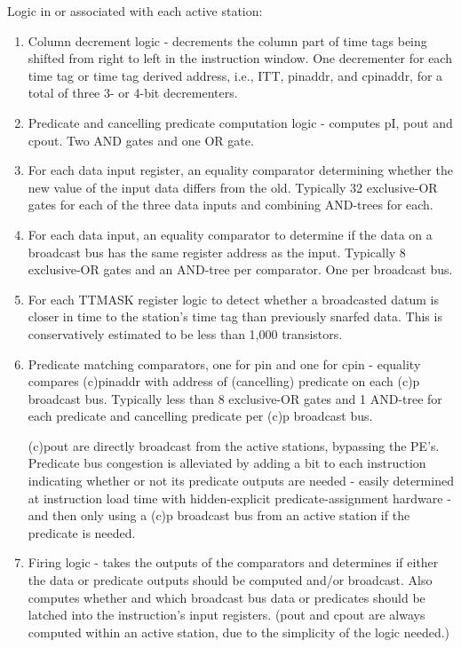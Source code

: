 \documentclass[10pt,dvips]{article}
\begin{document}
Logic in or associated with each active station:
\begin{enumerate}
\item Column decrement logic - decrements the column part of time tags being
shifted from right to left in the instruction window. One decrementer for each time tag
or time tag derived address, i.e., ITT, pinaddr, and cpinaddr, for a total of three
3- or 4-bit decrementers.

\item Predicate and cancelling predicate computation logic - computes pI, pout and
cpout. Two AND gates and one OR gate.

\item For each data input register, an equality comparator determining whether the new
value of the input data differs from the old. Typically 32 exclusive-OR gates for
each of the three data inputs and combining AND-trees for each. 

\item For each data input, an equality comparator to determine if the data on a
broadcast bus has the same register address as the input. 
Typically 8 exclusive-OR gates and an AND-tree per comparator.
One per broadcast bus.

\item For each TTMASK register logic to detect whether a broadcasted datum is
closer in time to the station's time tag than previously snarfed data.
This is conservatively estimated to be less than 1,000 transistors.

\item Predicate matching comparators, one for pin and one for cpin - equality
compares (c)pinaddr with address of (cancelling) predicate on each (c)p broadcast bus.
Typically less than 
8 exclusive-OR gates and 1 AND-tree for each predicate and cancelling
predicate per (c)p broadcast bus. 

(c)pout are directly broadcast
from the active stations, bypassing the PE's.
Predicate bus congestion is alleviated by adding a bit
to each instruction indicating whether or not
its predicate outputs are needed - easily determined at instruction
load time with hidden-explicit
predicate-assignment hardware - and then only using a (c)p
broadcast bus from an active station if the predicate is needed.

\item Firing logic - takes the outputs of the comparators and determines if either
the data or predicate outputs should be computed and/or broadcast. Also computes
whether and which broadcast bus data or predicates should be latched into the
instruction's input registers. (pout and cpout
are always computed within an active station, due to the simplicity of the logic
needed.)

\end{enumerate}
\end{document}

